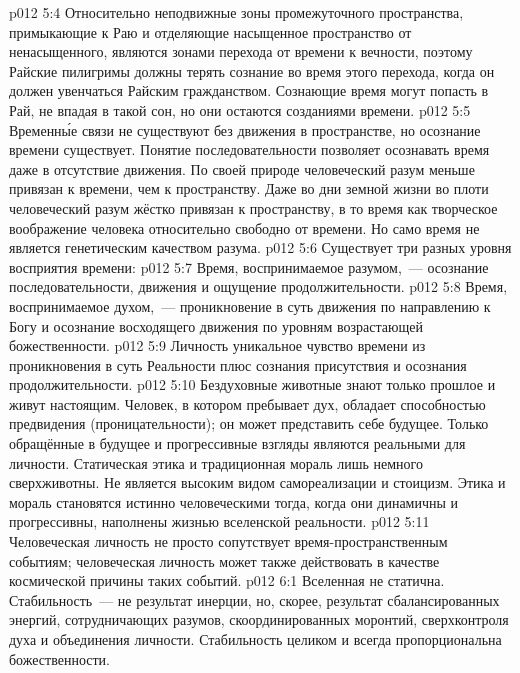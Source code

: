 \vs p012 5:4 Относительно неподвижные зоны промежуточного пространства, примыкающие к Раю и отделяющие насыщенное пространство от ненасыщенного, являются зонами перехода от времени к вечности, поэтому Райские пилигримы должны терять сознание во время этого перехода, когда он должен увенчаться Райским гражданством. Сознающие время  могут попасть в Рай, не впадая в такой сон, но они остаются созданиями времени.
\vs p012 5:5 \pc Временн\'ые связи не существуют без движения в пространстве, но осознание времени существует. Понятие последовательности позволяет осознавать время даже в отсутствие движения. По своей природе человеческий разум меньше привязан к времени, чем к пространству. Даже во дни земной жизни во плоти человеческий разум жёстко привязан к пространству, в то время как творческое воображение человека относительно свободно от времени. Но само время не является генетическим качеством разума.
\vs p012 5:6 \pc Существует три разных уровня восприятия времени:
\vs p012 5:7 Время, воспринимаемое разумом,~--- осознание последовательности, движения и ощущение продолжительности.
\vs p012 5:8 Время, воспринимаемое духом,~--- проникновение в суть движения по направлению к Богу и осознание восходящего движения по уровням возрастающей божественности.
\vs p012 5:9 Личность  уникальное чувство времени из проникновения в суть Реальности плюс сознания присутствия и осознания продолжительности.
\vs p012 5:10 \pc Бездуховные животные знают только прошлое и живут настоящим. Человек, в котором пребывает дух, обладает способностью предвидения (проницательности); он может представить себе будущее. Только обращённые в будущее и прогрессивные взгляды являются реальными для личности. Статическая этика и традиционная мораль лишь немного сверхживотны. Не является высоким видом самореализации и стоицизм. Этика и мораль становятся истинно человеческими тогда, когда они динамичны и прогрессивны, наполнены жизнью вселенской реальности.
\vs p012 5:11 Человеческая личность не просто сопутствует время\hyp{}пространственным событиям; человеческая личность может также действовать в качестве космической причины таких событий.
\vs p012 6:1 Вселенная не статична. Стабильность~--- не результат инерции, но, скорее, результат сбалансированных энергий, сотрудничающих разумов, скоординированных моронтий, сверхконтроля духа и объединения личности. Стабильность целиком и всегда пропорциональна божественности.
